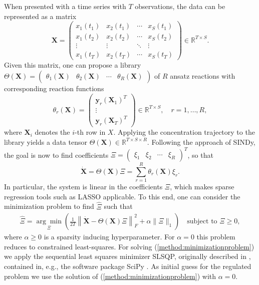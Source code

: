 \documentclass[oneside, abstracton, titlepage]{scrartcl}
\begin{document}
	When presented with a time series with $T$ observations, the data can be represented as a matrix
	\[
	\textbf{X} = \begin{pmatrix}
		x_1(t_1) & x_2(t_1) & \cdots & x_S(t_1) \\
		x_1(t_2) & x_2(t_2) & \cdots & x_S(t_2) \\
		\vdots   & \vdots   & \ddots & \vdots   \\
		x_1(t_T) & x_2(t_T) & \cdots & x_S(t_T)
	\end{pmatrix} \in \mathbb{R}^{T\times S}.
	\]
	Given this matrix, one can propose a library $\Theta(\textbf{X}) = \begin{pmatrix} \theta_1(\textbf{X}) & \theta_2(\textbf{X}) & \cdots & \theta_R(\textbf{X}) \end{pmatrix}$ of $R$ ansatz reactions with corresponding reaction functions
	\[
	\theta_r(\textbf{X}) = \begin{pmatrix}
	\textbf{y}_r(\textbf{X}_1)^T \\ \vdots \\ \textbf{y}_r(\textbf{X}_T)^T
	\end{pmatrix}\in \mathbb{R}^{T\times S},\quad r=1,\ldots,R,
	\]
	where $\textbf{X}_i$ denotes the $i$-th row in $X$. Applying the concentration trajectory to the library yields a data tensor $\Theta(\textbf{X})\in\mathbb{R}^{T\times S\times R}$. Following the approach of SINDy, the goal is now to find coefficients $\Xi = \begin{pmatrix} \xi_1 & \xi_2 & \cdots & \xi_R
	\end{pmatrix}^T$, so that
	\[
	\dot{\textbf{X}} = \Theta(\textbf{X})\Xi = \sum_{r=1}^{R}\theta_r(\textbf{X})\xi_r.
	\]
	In particular, the system is linear in the coefficients $\Xi$, which makes sparse regression tools such as LASSO \cite{Tibshirani1996, Hastie2009} applicable. To this end, one can consider the minimization problem to find $\hat{\Xi}$ such that
	\begin{align}
		\hat{\Xi} = \underset{\Xi}{\arg\min}\left( \frac{1}{2T}\left\| \dot{\textbf{X}} - \Theta(\textbf{X})\Xi \right\|_F^2 + \alpha\|\Xi\|_1 \right) \quad \text{subject to }\Xi \geq 0,
	\label{method:minimizationproblem}\end{align}
	where $\alpha\geq 0$ is a sparsity inducing hyperparameter. For $\alpha=0$ this problem reduces to constrained least-squares. For solving (\ref{method:minimizationproblem}) we apply the sequential least squares minimizer SLSQP, originally described in \cite{Kraft1988}, contained in, e.g., the software package SciPy \cite{SciPy}. As initial guess for the regulated problem we use the solution of (\ref{method:minimizationproblem}) with $\alpha=0$.
	
\end{document}
